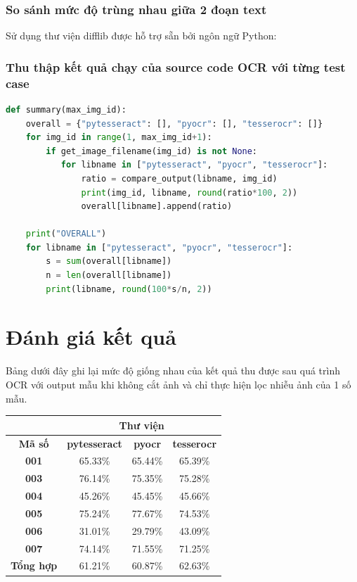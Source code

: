 \documentclass[12pt,a4paper]{article}
\begin{document}


\subsubsection{So sánh mức độ trùng nhau giữa 2 đoạn text}

Sử dụng thư viện difflib được hỗ trợ sẵn bởi ngôn ngữ Python:



\subsubsection{Thu thập kết quả chạy của source code OCR với từng test case}



\begin{lstlisting}[language=Python]
def summary(max_img_id):
    overall = {"pytesseract": [], "pyocr": [], "tesserocr": []}
    for img_id in range(1, max_img_id+1):
        if get_image_filename(img_id) is not None:
           for libname in ["pytesseract", "pyocr", "tesserocr"]:
               ratio = compare_output(libname, img_id)
               print(img_id, libname, round(ratio*100, 2))
               overall[libname].append(ratio)

    print("OVERALL")
    for libname in ["pytesseract", "pyocr", "tesserocr"]:
        s = sum(overall[libname])
        n = len(overall[libname])
        print(libname, round(100*s/n, 2))
\end{lstlisting}

\section{Đánh giá kết quả}

Bảng dưới đây ghi lại mức độ giống nhau của kết quả thu được sau quá trình OCR với output mẫu khi không cắt ảnh và chỉ thực hiện lọc nhiễu ảnh của 1 số mẫu.

\begin{tabular}{|c|c|c|c|}
\hline & \multicolumn{3}{c|}{Thư viện} \\
\hline \textbf{Mã số} & \textbf{pytesseract} & \textbf{pyocr} & \textbf{tesserocr} \\
\hline \textbf{001} & 65.33\% & 65.44\% & 65.39\% \\
\hline \textbf{003} & 76.14\% & 75.35\% & 75.28\% \\
\hline \textbf{004} & 45.26\% & 45.45\% & 45.66\% \\
\hline \textbf{005} & 75.24\% & 77.67\% & 74.53\% \\
\hline \textbf{006} & 31.01\% & 29.79\% & 43.09\% \\
\hline \textbf{007} & 74.14\% & 71.55\% & 71.25\% \\
\hline \textbf{Tổng hợp} & 61.21\% & 60.87\% & 62.63\% \\
\hline
\end{tabular}
\end{document}
